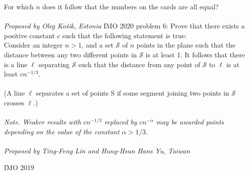 For which $n$ does it follow that the numbers on the cards are all equal? \\\\
\textit{Proposed by Oleg Košik, Estonia} 
IMO 2020 problem 6:  Prove that there exists a positive constant $c$ such that the following statement is true: \\
Consider an integer $n > 1$, and a set $\mathcal S$ of $n$ points in the plane such that the distance between any two different points in $\mathcal S$ is at least 1. It follows that there is a line $\ell$ separating $\mathcal S$ such that the distance from any point of $\mathcal S$ to $\ell$ is at least $cn^{-1/3}$. \\\\
(A line $\ell$ separates a set of points S if some segment joining two points in $\mathcal S$ crosses $\ell$.) \\\\
\textit{Note. Weaker results with $cn^{-1/3}$ replaced by $cn^{-\alpha}$ may be awarded points depending on the value of the constant $\alpha > 1/3$.} \\\\
\textit{Proposed by Ting-Feng Lin and Hung-Hsun Hans Yu, Taiwan} 

IMO 2019 

